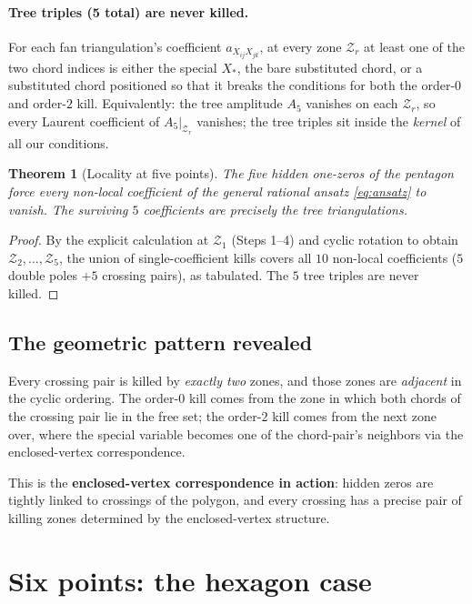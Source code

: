 \documentclass[11pt]{article}
\newtheorem{theorem}{Theorem}
\newcommand{\Zr}{\mathcal{Z}}
\begin{document}
\paragraph{Tree triples (5 total) are never killed.}
For each fan triangulation's coefficient $a_{X_{ij} X_{jk}}$, at every
zone $\Zr_r$ at least one of the two chord indices is either the
special $X_\ast$, the bare substituted chord, or a substituted chord
positioned so that it breaks the conditions for both the order-$0$ and
order-$2$ kill. Equivalently: the tree amplitude $A_5$ vanishes on each
$\Zr_r$, so every Laurent coefficient of $A_5|_{\Zr_r}$ vanishes; the
tree triples sit inside the \emph{kernel} of all our conditions.

\begin{theorem}[Locality at five points]\label{thm:loc5}
The five hidden one-zeros of the pentagon force every non-local
coefficient of the general rational ansatz \eqref{eq:ansatz} to vanish.
The surviving $5$ coefficients are precisely the tree triangulations.
\end{theorem}
\begin{proof}
By the explicit calculation at $\Zr_1$ (Steps 1--4) and cyclic rotation
to obtain $\Zr_2, \dots, \Zr_5$, the union of single-coefficient kills
covers all $10$ non-local coefficients ($5$ double poles $+ 5$ crossing
pairs), as tabulated. The $5$ tree triples are never killed.
\end{proof}

\subsection{The geometric pattern revealed}

Every crossing pair is killed by \emph{exactly two} zones, and those
zones are \emph{adjacent} in the cyclic ordering. The order-$0$ kill
comes from the zone in which both chords of the crossing pair lie in
the free set; the order-$2$ kill comes from the next zone over, where
the special variable becomes one of the chord-pair's neighbors via the
enclosed-vertex correspondence.

This is the \textbf{enclosed-vertex correspondence in action}: hidden
zeros are tightly linked to crossings of the polygon, and every
crossing has a precise pair of killing zones determined by the
enclosed-vertex structure.

\section{Six points: the hexagon case}
\end{document}

